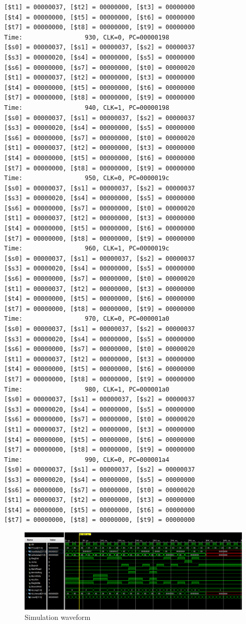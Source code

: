 \documentclass[a4paper,12pt]{article}
\begin{document}
\begin{lstlisting}
[$t1] = 00000037, [$t2] = 00000000, [$t3] = 00000000
[$t4] = 00000000, [$t5] = 00000000, [$t6] = 00000000
[$t7] = 00000000, [$t8] = 00000000, [$t9] = 00000000
Time:                 930, CLK=0, PC=00000198
[$s0] = 00000037, [$s1] = 00000037, [$s2] = 00000037
[$s3] = 00000020, [$s4] = 00000000, [$s5] = 00000000
[$s6] = 00000000, [$s7] = 00000000, [$t0] = 00000020
[$t1] = 00000037, [$t2] = 00000000, [$t3] = 00000000
[$t4] = 00000000, [$t5] = 00000000, [$t6] = 00000000
[$t7] = 00000000, [$t8] = 00000000, [$t9] = 00000000
Time:                 940, CLK=1, PC=00000198
[$s0] = 00000037, [$s1] = 00000037, [$s2] = 00000037
[$s3] = 00000020, [$s4] = 00000000, [$s5] = 00000000
[$s6] = 00000000, [$s7] = 00000000, [$t0] = 00000020
[$t1] = 00000037, [$t2] = 00000000, [$t3] = 00000000
[$t4] = 00000000, [$t5] = 00000000, [$t6] = 00000000
[$t7] = 00000000, [$t8] = 00000000, [$t9] = 00000000
Time:                 950, CLK=0, PC=0000019c
[$s0] = 00000037, [$s1] = 00000037, [$s2] = 00000037
[$s3] = 00000020, [$s4] = 00000000, [$s5] = 00000000
[$s6] = 00000000, [$s7] = 00000000, [$t0] = 00000020
[$t1] = 00000037, [$t2] = 00000000, [$t3] = 00000000
[$t4] = 00000000, [$t5] = 00000000, [$t6] = 00000000
[$t7] = 00000000, [$t8] = 00000000, [$t9] = 00000000
Time:                 960, CLK=1, PC=0000019c
[$s0] = 00000037, [$s1] = 00000037, [$s2] = 00000037
[$s3] = 00000020, [$s4] = 00000000, [$s5] = 00000000
[$s6] = 00000000, [$s7] = 00000000, [$t0] = 00000020
[$t1] = 00000037, [$t2] = 00000000, [$t3] = 00000000
[$t4] = 00000000, [$t5] = 00000000, [$t6] = 00000000
[$t7] = 00000000, [$t8] = 00000000, [$t9] = 00000000
Time:                 970, CLK=0, PC=000001a0
[$s0] = 00000037, [$s1] = 00000037, [$s2] = 00000037
[$s3] = 00000020, [$s4] = 00000000, [$s5] = 00000000
[$s6] = 00000000, [$s7] = 00000000, [$t0] = 00000020
[$t1] = 00000037, [$t2] = 00000000, [$t3] = 00000000
[$t4] = 00000000, [$t5] = 00000000, [$t6] = 00000000
[$t7] = 00000000, [$t8] = 00000000, [$t9] = 00000000
Time:                 980, CLK=1, PC=000001a0
[$s0] = 00000037, [$s1] = 00000037, [$s2] = 00000037
[$s3] = 00000020, [$s4] = 00000000, [$s5] = 00000000
[$s6] = 00000000, [$s7] = 00000000, [$t0] = 00000020
[$t1] = 00000037, [$t2] = 00000000, [$t3] = 00000000
[$t4] = 00000000, [$t5] = 00000000, [$t6] = 00000000
[$t7] = 00000000, [$t8] = 00000000, [$t9] = 00000000
Time:                 990, CLK=0, PC=000001a4
[$s0] = 00000037, [$s1] = 00000037, [$s2] = 00000037
[$s3] = 00000020, [$s4] = 00000000, [$s5] = 00000000
[$s6] = 00000000, [$s7] = 00000000, [$t0] = 00000020
[$t1] = 00000037, [$t2] = 00000000, [$t3] = 00000000
[$t4] = 00000000, [$t5] = 00000000, [$t6] = 00000000
[$t7] = 00000000, [$t8] = 00000000, [$t9] = 00000000
\end{lstlisting}

\begin{figure}[H]
\centering
\includegraphics[scale=0.55]{simulation_waveform.PNG}
\caption{Simulation waveform}

\end{figure}
\end{document}
